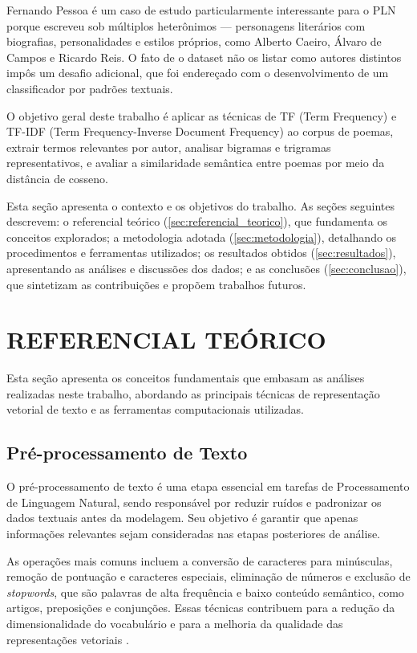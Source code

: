 \documentclass[
	article,
	12pt,
	oneside,
	a4paper,
	english,
	brazil,
	sumario=tradicional
]{abntex2}
\begin{document}
Fernando Pessoa é um caso de estudo particularmente interessante para o PLN porque escreveu sob múltiplos heterônimos — personagens literários com biografias, personalidades e estilos próprios, como Alberto Caeiro, Álvaro de Campos e Ricardo Reis. O fato de o dataset não os listar como autores distintos impôs um desafio adicional, que foi endereçado com o desenvolvimento de um classificador por padrões textuais.

O objetivo geral deste trabalho é aplicar as técnicas de TF (Term Frequency) e TF-IDF (Term Frequency-Inverse Document Frequency) ao corpus de poemas, extrair termos relevantes por autor, analisar bigramas e trigramas representativos, e avaliar a similaridade semântica entre poemas por meio da distância de cosseno.

Esta seção apresenta o contexto e os objetivos do trabalho. As seções seguintes descrevem: o referencial teórico (\autoref{sec:referencial_teorico}), que fundamenta os conceitos explorados; a metodologia adotada (\autoref{sec:metodologia}), detalhando os procedimentos e ferramentas utilizados; os resultados obtidos (\autoref{sec:resultados}), apresentando as análises e discussões dos dados; e as conclusões (\autoref{sec:conclusao}), que sintetizam as contribuições e propõem trabalhos futuros.

\section{\textbf{REFERENCIAL TEÓRICO}}
\label{sec:referencial_teorico}

Esta seção apresenta os conceitos fundamentais que embasam as análises realizadas neste trabalho, abordando as principais técnicas de representação vetorial de texto e as ferramentas computacionais utilizadas.

\subsection{Pré-processamento de Texto}

O pré-processamento de texto é uma etapa essencial em tarefas de Processamento de Linguagem Natural, sendo responsável por reduzir ruídos e padronizar os dados textuais antes da modelagem. Seu objetivo é garantir que apenas informações relevantes sejam consideradas nas etapas posteriores de análise.

As operações mais comuns incluem a conversão de caracteres para minúsculas, remoção de pontuação e caracteres especiais, eliminação de números e exclusão de \textit{stopwords}, que são palavras de alta frequência e baixo conteúdo semântico, como artigos, preposições e conjunções. Essas técnicas contribuem para a redução da dimensionalidade do vocabulário e para a melhoria da qualidade das representações vetoriais \cite{bird2009nltk}.
\end{document}
